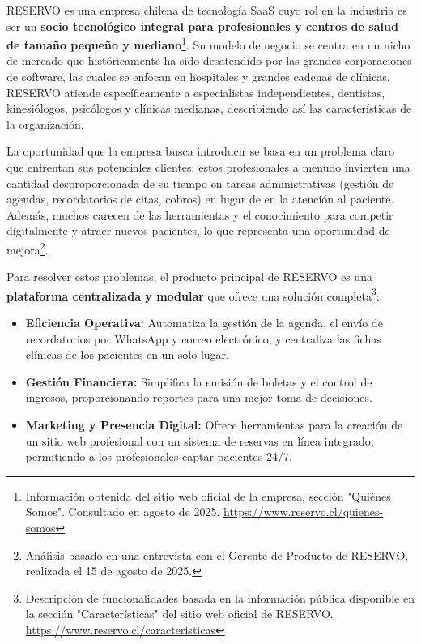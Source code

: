 RESERVO es una empresa chilena de tecnología SaaS cuyo rol en la industria es ser un \textbf{socio tecnológico integral para profesionales y centros de salud de tamaño pequeño y mediano}\footnote{Información obtenida del sitio web oficial de la empresa, sección "Quiénes Somos". Consultado en agosto de 2025. \url{https://www.reservo.cl/quienes-somos}}. Su modelo de negocio se centra en un nicho de mercado que históricamente ha sido desatendido por las grandes corporaciones de software, las cuales se enfocan en hospitales y grandes cadenas de clínicas. RESERVO atiende específicamente a especialistas independientes, dentistas, kinesiólogos, psicólogos y clínicas medianas, describiendo así las características de la organización.

La oportunidad que la empresa busca introducir se basa en un problema claro que enfrentan sus potenciales clientes: estos profesionales a menudo invierten una cantidad desproporcionada de su tiempo en tareas administrativas (gestión de agendas, recordatorios de citas, cobros) en lugar de en la atención al paciente. Además, muchos carecen de las herramientas y el conocimiento para competir digitalmente y atraer nuevos pacientes, lo que representa una oportunidad de mejora\footnote{Análisis basado en una entrevista con el Gerente de Producto de RESERVO, realizada el 15 de agosto de 2025.}.

Para resolver estos problemas, el producto principal de RESERVO es una \textbf{plataforma centralizada y modular} que ofrece una solución completa\footnote{Descripción de funcionalidades basada en la información pública disponible en la sección "Características" del sitio web oficial de RESERVO. \url{https://www.reservo.cl/caracteristicas}}:

\begin{itemize}
    \item \textbf{Eficiencia Operativa:} Automatiza la gestión de la agenda, el envío de recordatorios por WhatsApp y correo electrónico, y centraliza las fichas clínicas de los pacientes en un solo lugar.
    
    \item \textbf{Gestión Financiera:} Simplifica la emisión de boletas y el control de ingresos, proporcionando reportes para una mejor toma de decisiones.
    
    \item \textbf{Marketing y Presencia Digital:} Ofrece herramientas para la creación de un sitio web profesional con un sistema de reservas en línea integrado, permitiendo a los profesionales captar pacientes 24/7.
\end{itemize}

